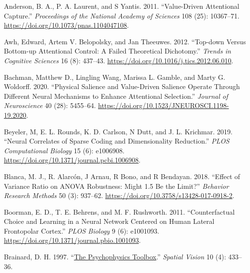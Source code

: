 \documentclass[11pt,halfline,a4paper,]{ouparticle}
\newlength{\cslhangindent}
\newlength{\cslentryspacingunit} %
\newenvironment{CSLReferences}[2] %
 {%
  \setlength{\parindent}{0pt}
  \ifodd #1
  \let\oldpar\par
  \def\par{\hangindent=\cslhangindent\oldpar}
  \fi
  \setlength{\parskip}{#2\cslentryspacingunit}
 }%
 {}
\begin{document}
\hypertarget{refs}{}
\begin{CSLReferences}{1}{0}
\leavevmode{}%
Anderson, B. A., P. A. Laurent, and S Yantis. 2011. {``Value-Driven Attentional Capture.''} \emph{Proceedings of the National Academy of Sciences} 108 (25): 10367--71. \url{https://doi.org/10.1073/pnas.1104047108}.

\leavevmode{}%
Awh, Edward, Artem V. Belopolsky, and Jan Theeuwes. 2012. {``Top-down Versus Bottom-up Attentional Control: A Failed Theoretical Dichotomy.''} \emph{Trends in Cognitive Sciences} 16 (8): 437--43. \url{https://doi.org/10.1016/j.tics.2012.06.010}.

\leavevmode{}%
Bachman, Matthew D., Lingling Wang, Marissa L. Gamble, and Marty G. Woldorff. 2020. {``Physical {Salience} and {Value-Driven Salience Operate} Through {Different Neural Mechanisms} to {Enhance Attentional Selection}.''} \emph{Journal of Neuroscience} 40 (28): 5455--64. \url{https://doi.org/10.1523/JNEUROSCI.1198-19.2020}.

\leavevmode{}%
Beyeler, M, E. L. Rounds, K. D. Carlson, N Dutt, and J. L. Krichmar. 2019. {``Neural Correlates of Sparse Coding and Dimensionality Reduction.''} \emph{PLOS Computational Biology} 15 (6): e1006908. \url{https://doi.org/10.1371/journal.pcbi.1006908}.

\leavevmode{}%
Blanca, M. J., R. Alarcón, J Arnau, R Bono, and R Bendayan. 2018. {``Effect of Variance Ratio on {ANOVA} Robustness: {Might} 1.5 Be the Limit?''} \emph{Behavior Research Methods} 50 (3): 937--62. \url{https://doi.org/10.3758/s13428-017-0918-2}.

\leavevmode{}%
Boorman, E. D., T. E. Behrens, and M. F. Rushworth. 2011. {``Counterfactual {Choice} and {Learning} in a {Neural Network Centered} on {Human Lateral Frontopolar Cortex}.''} \emph{PLOS Biology} 9 (6): e1001093. \url{https://doi.org/10.1371/journal.pbio.1001093}.

\leavevmode{}%
Brainard, D. H. 1997. {``\href{https://www.ncbi.nlm.nih.gov/pubmed/9176952}{The {Psychophysics Toolbox}}.''} \emph{Spatial Vision} 10 (4): 433--36.


\end{CSLReferences}
\end{document}
